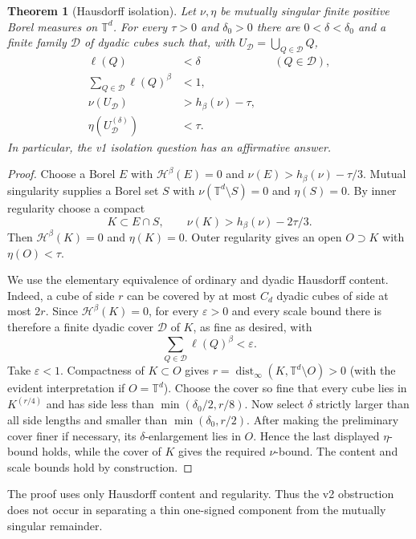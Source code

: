 \documentclass[11pt]{article}
\newtheorem{theorem}{Theorem}
\newcommand{\T}{\mathbb T}
\newcommand{\Hd}{\mathcal H}
\begin{document}
\begin{theorem}[Hausdorff isolation]\label{thm:isolation}
Let $\nu,\eta$ be mutually singular finite positive Borel measures on
$\T^d$.  For every $\tau>0$ and $\delta_0>0$ there are
$0<\delta<\delta_0$ and a finite family $\mathcal D$ of dyadic cubes such
that, with $U_{\mathcal D}=\bigcup_{Q\in\mathcal D}Q$,
\begin{align*}
 \ell(Q)&<\delta &&(Q\in\mathcal D),\\
 \sum_{Q\in\mathcal D}\ell(Q)^\beta&<1,\\
 \nu(U_{\mathcal D})&>h_\beta(\nu)-\tau,\\
 \eta(U_{\mathcal D}^{(\delta)})&<\tau.
\end{align*}
In particular, the v1 isolation question has an affirmative answer.
\end{theorem}

\begin{proof}
Choose a Borel $E$ with $\Hd^\beta(E)=0$ and
$\nu(E)>h_\beta(\nu)-\tau/3$.  Mutual singularity supplies a Borel set $S$
with $\nu(\T^d\setminus S)=0$ and $\eta(S)=0$.  By inner regularity choose
a compact
\[
 K\subset E\cap S,\qquad \nu(K)>h_\beta(\nu)-2\tau/3.
\]
Then $\Hd^\beta(K)=0$ and $\eta(K)=0$.  Outer regularity gives an open
$O\supset K$ with $\eta(O)<\tau$.

We use the elementary equivalence of ordinary and dyadic Hausdorff content.
Indeed, a cube of side $r$ can be covered by at most $C_d$ dyadic cubes of
side at most $2r$.  Since $\Hd^\beta(K)=0$, for every $\varepsilon>0$ and
every scale bound there is therefore a finite dyadic cover $\mathcal D$ of
$K$, as fine as desired, with
\[
                 \sum_{Q\in\mathcal D}\ell(Q)^\beta<\varepsilon.
\]
Take $\varepsilon<1$.  Compactness of $K\subset O$ gives
$r=\operatorname{dist}_\infty(K,\T^d\setminus O)>0$ (with the evident
interpretation if $O=\T^d$).  Choose the cover so fine that every cube lies
in $K^{(r/4)}$ and has side less than
$\min(\delta_0/2,r/8)$.  Now select $\delta$ strictly larger than all side
lengths and smaller than $\min(\delta_0,r/2)$.  After making the preliminary
cover finer if necessary, its $\delta$-enlargement lies in $O$.  Hence the
last displayed $\eta$-bound holds, while the cover of $K$ gives the required
$\nu$-bound.  The content and scale bounds hold by construction.
\end{proof}

The proof uses only Hausdorff content and regularity.  Thus the v2 obstruction
does not occur in separating a thin one-signed component from the mutually
singular remainder.
\end{document}

